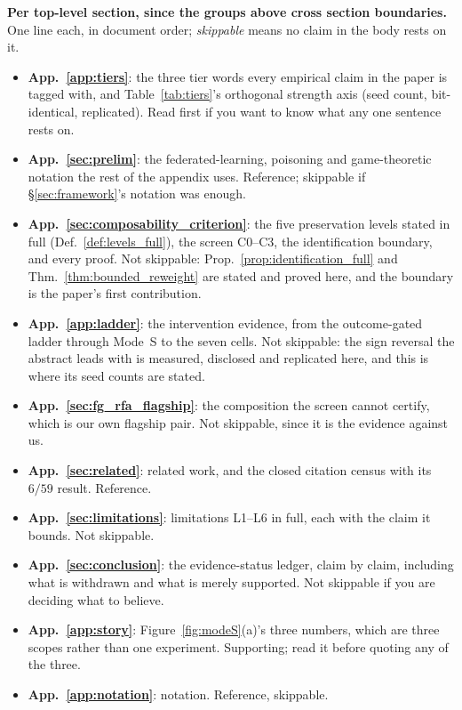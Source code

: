 \documentclass{article}
\begin{document}
\noindent \textbf{Per top-level section, since the groups above cross section boundaries.} One line
each, in document order; \emph{skippable} means no claim in the body rests on it.
\begin{itemize}[noitemsep,topsep=2pt]
\item \textbf{App.~\ref{app:tiers}}: the three tier words every empirical claim in the paper is tagged with, and Table~\ref{tab:tiers}'s orthogonal strength axis (seed count, bit-identical, replicated). Read first if you want to know what any one sentence rests on.
\item \textbf{App.~\ref{sec:prelim}}: the federated-learning, poisoning and game-theoretic notation the rest of the appendix uses. Reference; skippable if §\ref{sec:framework}'s notation was enough.
\item \textbf{App.~\ref{sec:composability_criterion}}: the five preservation levels stated in full (Def.~\ref{def:levels_full}), the screen C0--C3, the identification boundary, and every proof. Not skippable: Prop.~\ref{prop:identification_full} and Thm.~\ref{thm:bounded_reweight} are stated and proved here, and the boundary is the paper's first contribution.
\item \textbf{App.~\ref{app:ladder}}: the intervention evidence, from the outcome-gated ladder through Mode~S to the seven cells. Not skippable: the sign reversal the abstract leads with is measured, disclosed and replicated here, and this is where its seed counts are stated.
\item \textbf{App.~\ref{sec:fg_rfa_flagship}}: the composition the screen cannot certify, which is our own flagship pair. Not skippable, since it is the evidence against us.
\item \textbf{App.~\ref{sec:related}}: related work, and the closed citation census with its $6/59$ result. Reference.
\item \textbf{App.~\ref{sec:limitations}}: limitations L1--L6 in full, each with the claim it bounds. Not skippable.
\item \textbf{App.~\ref{sec:conclusion}}: the evidence-status ledger, claim by claim, including what is withdrawn and what is merely supported. Not skippable if you are deciding what to believe.
\item \textbf{App.~\ref{app:story}}: Figure~\ref{fig:modeS}(a)'s three numbers, which are three scopes rather than one experiment. Supporting; read it before quoting any of the three.
\item \textbf{App.~\ref{app:notation}}: notation. Reference, skippable.
\end{itemize}
\end{document}
